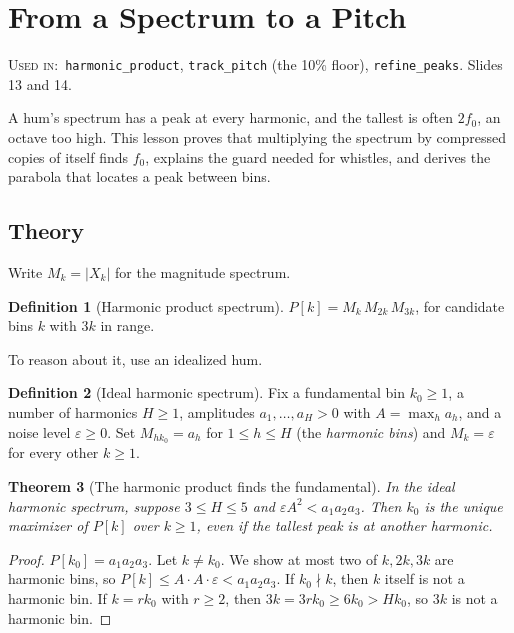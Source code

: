\documentclass[11pt]{article}
\newtheorem{theorem}{Theorem}[section]
\theoremstyle{definition}
\newtheorem{definition}[theorem]{Definition}
\newcommand{\abs}[1]{\lvert #1\rvert}
\newcommand{\code}[1]{\texttt{#1}}
\newcommand{\usedin}[1]{\par\noindent\colorbox{black!8}{\parbox{\dimexpr\linewidth-2\fboxsep\relax}{\small\textsc{Used in:}~#1}}\par\medskip}
\begin{document}
\section{From a Spectrum to a Pitch}\label{sec:pitch}
\usedin{\code{harmonic\_product}, \code{track\_pitch} (the 10\% floor),
\code{refine\_peaks}. Slides 13 and 14.}

A hum's spectrum has a peak at every harmonic, and the tallest is often $2f_0$, an
octave too high. This lesson proves that multiplying the spectrum by compressed copies
of itself finds $f_0$, explains the guard needed for whistles, and derives the
parabola that locates a peak between bins.

\subsection{Theory}

Write $M_k=\abs{X_k}$ for the magnitude spectrum.

\begin{definition}[Harmonic product spectrum]
$P[k]=M_k\,M_{2k}\,M_{3k}$, for candidate bins $k$ with $3k$ in range.
\end{definition}

To reason about it, use an idealized hum.

\begin{definition}[Ideal harmonic spectrum]
Fix a fundamental bin $k_0\ge1$, a number of harmonics $H\ge1$, amplitudes
$a_1,\dots,a_H>0$ with $A=\max_ha_h$, and a noise level $\varepsilon\ge0$. Set
$M_{hk_0}=a_h$ for $1\le h\le H$ (the \emph{harmonic bins}) and $M_k=\varepsilon$ for
every other $k\ge1$.
\end{definition}

\begin{theorem}[The harmonic product finds the fundamental]\label{thm:hps}
In the ideal harmonic spectrum, suppose $3\le H\le5$ and $\varepsilon A^2<a_1a_2a_3$.
Then $k_0$ is the unique maximizer of $P[k]$ over $k\ge1$, even if the tallest peak is
at another harmonic.
\end{theorem}
\begin{proof}
$P[k_0]=a_1a_2a_3$. Let $k\ne k_0$. We show at most two of $k,2k,3k$ are harmonic
bins, so $P[k]\le A\cdot A\cdot\varepsilon<a_1a_2a_3$.
If $k_0\nmid k$, then $k$ itself is not a harmonic bin.
If $k=rk_0$ with $r\ge2$, then $3k=3rk_0\ge6k_0>Hk_0$, so $3k$ is not a harmonic bin.
\end{proof}
\end{document}
